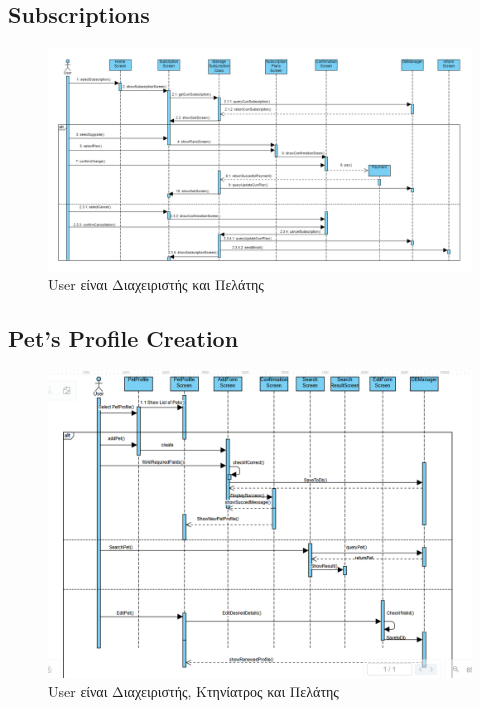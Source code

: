 \documentclass[12pt,a4paper,twoside]{book}
\begin{document}
\subsection{Subscriptions}
\begin{figure}[H]
    \centering
    \includegraphics[width=\textwidth]{Resources/Sequence Diagram/Subscription_Sequence.png}
    \caption{User είναι Διαχειριστής και Πελάτης}\label{fig:sequence-subscription}
\end{figure}

\subsection{Pet's Profile Creation}
\begin{figure}[H]
    \centering
    \includegraphics[width=\textwidth]{Resources/Sequence Diagram/PetProfileSequence.png}
    \caption{User είναι Διαχειριστής, Κτηνίατρος και Πελάτης}\label{fig:sequence-pet-profile}
\end{figure}
\end{document}
